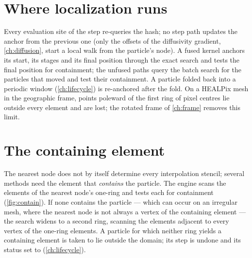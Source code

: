 
\section{Where localization runs}\label{sec:loc-where}

Every evaluation site of the step re-queries the hash; no step path updates the anchor from the previous
one (only the offsets of the diffusivity gradient, \cref{ch:diffusion}, start a local walk from the
particle's node). A fused
kernel anchors its start, its stages and its final position through the exact search and tests the
final position for containment; the unfused paths query the batch search for the particles that
moved and test their containment. A particle folded back into a periodic window
(\cref{ch:lifecycle}) is re-anchored after the fold. On a HEALPix mesh in the geographic frame, points
poleward of the first ring of pixel centres lie outside every element and are lost; the rotated frame
of \cref{ch:frame} removes this limit.

\section{The containing element}\label{sec:loc-contain}

The nearest node does not by itself determine every interpolation stencil; several methods need the
element that \emph{contains} the particle. The engine scans the elements of the nearest node's
one-ring and tests each for containment (\cref{fig:contain}). If none contains the particle --- which
can occur on an irregular mesh, where the nearest node is not always a vertex of the containing
element --- the search widens to a second ring, scanning the elements adjacent to every vertex of the
one-ring elements. A particle for which neither ring yields a containing element is taken to lie
outside the domain; its step is undone and its status set to  (\cref{ch:lifecycle}).


